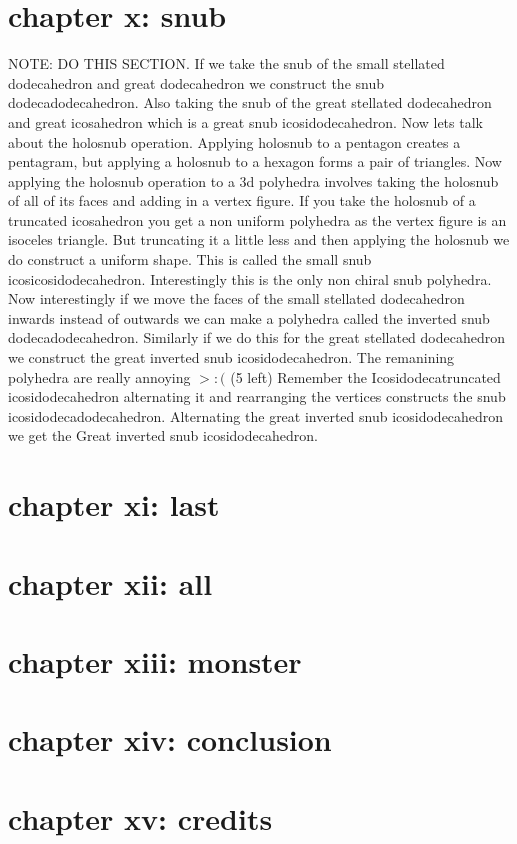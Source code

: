 \documentclass{article}
\begin{document}
\section*{chapter x: snub}
NOTE: DO THIS SECTION.
If we take the snub of the small stellated dodecahedron and great dodecahedron we construct the snub dodecadodecahedron. Also taking the snub of the great stellated dodecahedron and great icosahedron which is a great snub icosidodecahedron. Now lets talk about the holosnub operation. Applying holosnub to a pentagon creates a pentagram, but applying a holosnub to a hexagon forms a pair of triangles. Now applying the holosnub operation to a 3d polyhedra involves taking the holosnub of all of its faces and adding in a vertex figure. If you take the holosnub of a truncated icosahedron you get a non uniform polyhedra as the vertex figure is an isoceles triangle. But truncating it a little less and then applying the holosnub we do construct a uniform shape. This is called the small snub icosicosidodecahedron. Interestingly this is the only non chiral snub polyhedra. Now interestingly if we move the faces of the small stellated dodecahedron inwards instead of outwards we can make a polyhedra called the inverted snub dodecadodecahedron. Similarly if we do this for the great stellated dodecahedron we construct the great inverted snub icosidodecahedron. The remanining polyhedra are really annoying $>:($ (5 left) 
Remember the Icosidodecatruncated icosidodecahedron alternating it and rearranging the vertices constructs the snub icosidodecadodecahedron.  Alternating the great inverted snub icosidodecahedron we get the Great inverted snub icosidodecahedron.
\section*{chapter xi: last}
\section*{chapter xii: all}
\section*{chapter xiii: monster}
\section*{chapter xiv: conclusion}
\section*{chapter xv: credits}
\newpage
\theendnotes
\end{document}
